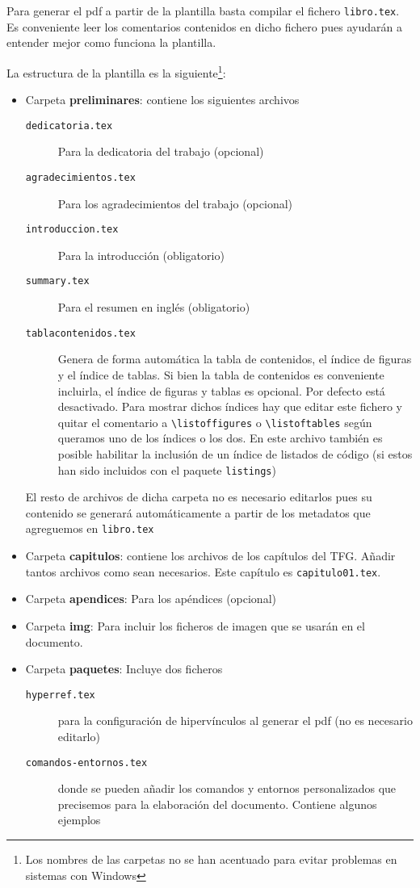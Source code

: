 Para generar el pdf a partir de la plantilla basta compilar el fichero \texttt{libro.tex}. Es conveniente leer los comentarios contenidos en dicho fichero pues ayudarán a entender mejor como funciona la plantilla.

La estructura de la plantilla es la siguiente\footnote{Los nombres de las carpetas no se han acentuado para evitar problemas en sistemas con Windows}:
\begin{itemize}
  \item Carpeta \textbf{preliminares}: contiene los siguientes archivos
    \begin{description}
      \item[\texttt{dedicatoria.tex}] Para la dedicatoria del trabajo (opcional)
      \item[\texttt{agradecimientos.tex}] Para los agradecimientos del trabajo (opcional)
      \item[\texttt{introduccion.tex}] Para la introducción (obligatorio)
      \item[\texttt{summary.tex}] Para el resumen en inglés (obligatorio)
      \item[\texttt{tablacontenidos.tex}] Genera de forma automática la tabla de contenidos, el índice de figuras y el índice de tablas. Si bien la tabla de contenidos es conveniente incluirla, el índice de figuras y tablas es opcional. Por defecto está desactivado. Para mostrar dichos índices hay que editar este fichero y quitar el comentario a \verb+\listoffigures+ o \verb+\listoftables+ según queramos uno de los índices o los dos. En este archivo también es posible habilitar la inclusión de un índice de listados de código (si estos han sido incluidos con el paquete \texttt{listings})
  \end{description}
  El resto de archivos de dicha carpeta no es necesario editarlos pues su contenido se generará automáticamente a partir de los metadatos que agreguemos en \texttt{libro.tex}

  \item Carpeta \textbf{capitulos}: contiene los archivos de los capítulos del TFG. Añadir tantos archivos como sean necesarios. Este capítulo es \texttt{capitulo01.tex}.

  \item Carpeta \textbf{apendices}: Para los apéndices (opcional)
  \item Carpeta \textbf{img}: Para incluir los ficheros de imagen que se usarán en el documento.
  \item Carpeta \textbf{paquetes}: Incluye dos ficheros
    \begin{description}
      \item[\texttt{hyperref.tex}] para la configuración de hipervínculos al generar el pdf (no es necesario editarlo)
      \item[\texttt{comandos-entornos.tex}] donde se pueden añadir los comandos y entornos personalizados que precisemos para la elaboración del documento. Contiene algunos ejemplos
    \end{description}


\end{itemize}
